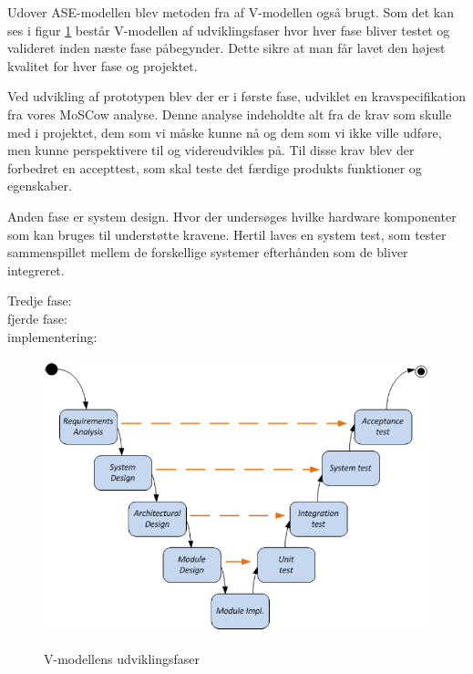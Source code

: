Udover ASE-modellen blev metoden fra af V-modellen også brugt. Som det kan ses i figur \ref{vmodel} består V-modellen af udviklingsfaser hvor hver fase bliver testet og valideret inden næste fase påbegynder. Dette sikre at man får lavet den højest kvalitet for hver fase og projektet.

Ved udvikling af prototypen blev der er i første fase, udviklet en kravspecifikation fra vores MoSCow analyse. Denne analyse indeholdte alt fra de krav som skulle med i projektet, dem som vi måske kunne nå og dem som vi ikke ville udføre, men kunne perspektivere til og videreudvikles på. Til disse krav blev der forbedret en accepttest, som skal teste det færdige produkts funktioner og egenskaber.

Anden fase er system design. Hvor der undersøges hvilke hardware komponenter som kan bruges til understøtte kravene. Hertil laves en system test, som tester sammenspillet mellem de forskellige systemer efterhånden som de bliver integreret. 

Tredje fase:\\
fjerde fase:\\
implementering:\\






\begin{figure}[H]
\centering
{\includegraphics[width=\textwidth]
{Figure/vmodel}}
\caption{V-modellens udviklingsfaser\cite{IngenirhjskolenAarhusUniversitetDevelopmentASE}}
\label{vmodel}
\end{figure}








